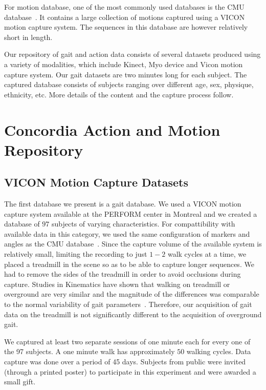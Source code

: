 \documentclass[jou,apacite]{apa6}
\begin{document}
For motion database, one of the most commonly used databases is the CMU database~\cite{CMU}. It contains a large collection of motions captured using a VICON motion capture system. The sequences in this database are however relatively short in length.

Our repository of gait and action data consists of several datasets produced using a variety of modalities, which include Kinect, Myo device and Vicon motion capture system. Our gait datasets are two minutes long for each subject. The captured database consists of subjects ranging over different age, sex, physique, ethnicity, etc. More details of the content and the capture process follow.
                        
\section{Concordia Action and Motion Repository}

\subsection{VICON Motion Capture Datasets}
The first database we present is a gait database. 
We used a VICON motion capture system available at the PERFORM center in Montreal and we created a database of $97$ subjects of varying characteristics. 
For compattibility with available data in this category, we used the same configuration of markers and angles as the CMU database~\cite{CMU}.
Since the capture volume of the available system is relatively small, limiting the recording to just $1-2$ walk cycles at a time, we placed a treadmill in the scene so as to be able to capture longer sequences.
We had to remove the sides of the treadmill in order to avoid occlusions during capture.
Studies in Kinematics have shown that walking on treadmill or overground are very similar and the magnitude of the differences was comparable to the normal variability of gait parameters~\cite{Riley200717}.
Therefore, our acquisition of gait data on the treadmill is not significantly different to the acquisition of overground gait.

We captured at least two separate sessions of one minute each for every one of the 97 subjects. A one minute walk has approximately $50$ walking cycles. Data capture was done over a period of 45 days. Subjects from public were invited (through a printed poster) to participate in this experiment and were awarded a small gift. 
\end{document}
